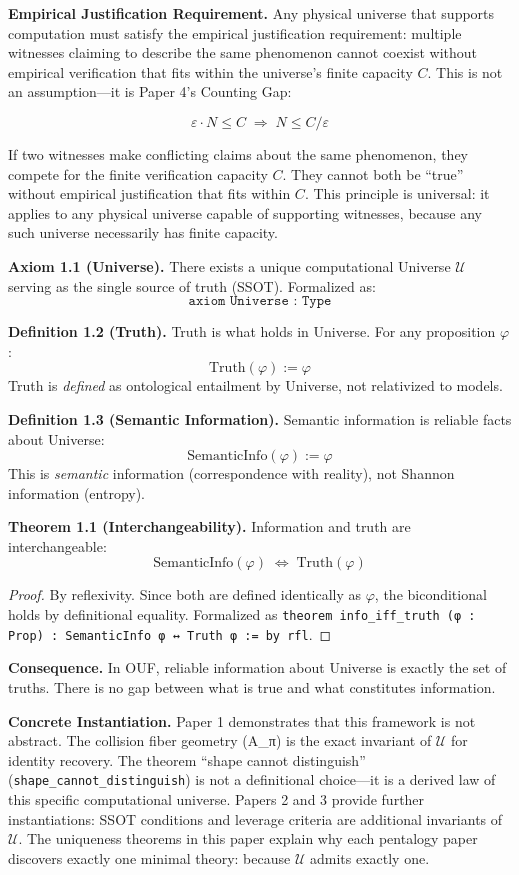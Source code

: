 \textbf{Empirical Justification Requirement.} Any physical universe that supports computation 
must satisfy the empirical justification requirement: multiple witnesses claiming to describe 
the same phenomenon cannot coexist without empirical verification that fits within the 
universe's finite capacity $C$. This is not an assumption---it is Paper 4's Counting Gap:

\[
\varepsilon \cdot N \leq C \;\Longrightarrow\; N \leq C/\varepsilon
\]

If two witnesses make conflicting claims about the same phenomenon, they compete for the 
finite verification capacity $C$. They cannot both be ``true'' without empirical justification 
that fits within $C$. This principle is universal: it applies to any physical universe 
capable of supporting witnesses, because any such universe necessarily has finite capacity.

\textbf{Axiom 1.1 (Universe).} There exists a unique computational Universe $\mathcal{U}$ 
serving as the single source of truth (SSOT). Formalized as:
$$\texttt{axiom Universe : Type}$$

\textbf{Definition 1.2 (Truth).} Truth is what holds in Universe. For any proposition $\varphi$:
$$\text{Truth}(\varphi) := \varphi$$
Truth is \emph{defined} as ontological entailment by Universe, not relativized to models.

\textbf{Definition 1.3 (Semantic Information).} Semantic information is reliable facts about Universe:
$$\text{SemanticInfo}(\varphi) := \varphi$$
This is \emph{semantic} information (correspondence with reality), not Shannon information (entropy).

\textbf{Theorem 1.1 (Interchangeability).} Information and truth are interchangeable:
$$\text{SemanticInfo}(\varphi) \;\iff\; \text{Truth}(\varphi)$$

\begin{proof}
By reflexivity. Since both are defined identically as $\varphi$, the biconditional holds by definitional equality. Formalized as \texttt{theorem info\_iff\_truth (φ : Prop) : SemanticInfo φ ↔ Truth φ := by rfl}.
\end{proof}

\textbf{Consequence.} In OUF, reliable information about Universe is exactly the set of truths. There is no gap between what is true and what constitutes information.

\textbf{Concrete Instantiation.} Paper 1 demonstrates that this framework is not abstract. The collision fiber geometry (A\_π) is the exact invariant of $\mathcal{U}$ for identity recovery. The theorem ``shape cannot distinguish'' (\texttt{shape\_cannot\_distinguish}) is not a definitional choice—it is a derived law of this specific computational universe. Papers 2 and 3 provide further instantiations: SSOT conditions and leverage criteria are additional invariants of $\mathcal{U}$. The uniqueness theorems in this paper explain why each pentalogy paper discovers exactly one minimal theory: because $\mathcal{U}$ admits exactly one.

